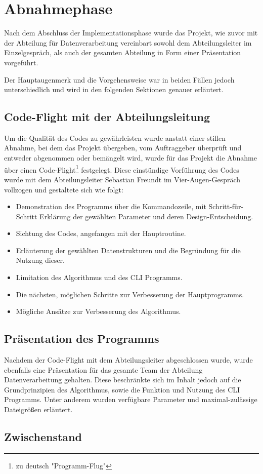 \section{Abnahmephase}
Nach dem Abschluss der Implementationsphase wurde das Projekt, wie zuvor mit der
Abteilung für Datenverarbeitung vereinbart sowohl dem Abteilungsleiter im Einzelgespräch,
als auch der gesamten Abteilung in Form einer Präsentation vorgeführt.

Der Hauptaugenmerk und die Vorgehensweise war in beiden Fällen jedoch unterschiedlich
und wird in den folgenden Sektionen genauer erläutert.

\subsection{Code-Flight mit der Abteilungsleitung}

Um die Qualität des Codes zu gewährleisten wurde anstatt einer stillen Abnahme,
bei dem das Projekt übergeben, vom Auftraggeber überprüft und entweder abgenommen
oder bemängelt wird, wurde für das Projekt die Abnahme über einen
Code-Flight\footnote{zu deutsch "Programm-Flug"} festgelegt. Diese einstündige
Vorführung des Codes wurde mit dem Abteilungsleiter Sebastian Freundt im
Vier-Augen-Gespräch vollzogen und gestaltete sich wie folgt:

\begin{itemize}
    \item Demonstration des Programms über die Kommandozeile, mit Schritt-für-Schritt Erklärung der gewählten Parameter und deren Design-Entscheidung.
    \item Sichtung des Codes, angefangen mit der Hauptroutine.
    \item Erläuterung der gewählten Datenstrukturen und die Begründung für die Nutzung dieser.
    \item Limitation des Algorithmus und des CLI Programms.
    \item Die nächsten, möglichen Schritte zur Verbesserung der Hauptprogramms.
    \item Mögliche Ansätze zur Verbesserung des Algorithmus.
\end{itemize}

\subsection{Präsentation des Programms}

Nachdem der Code-Flight mit dem Abteilungsleiter abgeschlossen wurde, wurde ebenfalls
eine Präsentation für das gesamte Team der Abteilung Datenverarbeitung gehalten.
Diese beschränkte sich im Inhalt jedoch auf die Grundprinzipien des Algorithmus, sowie
die Funktion und Nutzung des CLI Programms. Unter anderem wurden verfügbare
Parameter und maximal-zulässige Dateigrößen erläutert.

\subsection{Zwischenstand}
